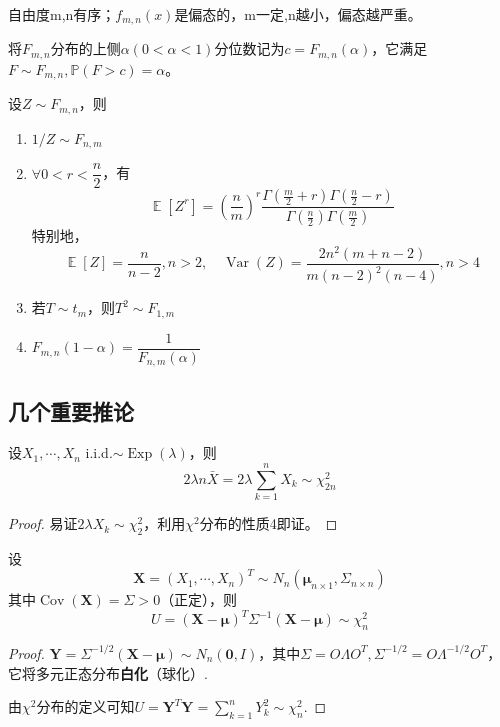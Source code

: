 \documentclass{ctexbook}
\DeclareMathOperator{\Var}{Var}          %
\DeclareMathOperator{\Cov}{Cov}          %
\DeclareMathOperator{\E}{\mathbb{E}}     %
\DeclareMathOperator{\Exp}{Exp}
\begin{document}
自由度m,n有序；$f_{m,n}(x)$是偏态的，m一定,n越小，偏态越严重。

将$F_{m,n}$分布的上侧$\alpha(0<\alpha<1)$分位数记为$c=F_{m,n}(\alpha)$，它满足$F\sim F_{m,n},\mathbb{P}(F>c)=\alpha$。

\begin{proposition}[F变量的性质]
    设$Z\sim F_{m,n}$，则\begin{enumerate}
        \item $1/Z\sim F_{n,m}$
        \item $\forall 0<r<\dfrac{n}{2}$，有$$\E[Z^r]=\left(\frac{n}{m}\right)^r\frac{\Gamma(\frac{m}{2}+r)\Gamma(\frac{n}{2}-r)}{\Gamma(\frac{n}{2})\Gamma(\frac{m}{2})}$$
        特别地，$$\E[Z]=\frac{n}{n-2},n>2,\quad \Var(Z)=\frac{2n^2(m+n-2)}{m(n-2)^2(n-4)},n>4$$
        \item 若$T\sim t_m$，则$T^2\sim F_{1,m}$
        \item $F_{m,n}(1-\alpha)=\dfrac{1}{F_{n,m}(\alpha)}$
    \end{enumerate}
\end{proposition}

\subsection{几个重要推论}

\begin{corollary}
    设$X_1,\cdots,X_n$ i.i.d.$\sim \Exp(\lambda)$，则
    $$2\lambda n\bar{X}=2\lambda\sum_{k=1}^n X_k\sim\chi_{2n}^2$$
\end{corollary}
\begin{proof}
    易证$2\lambda X_k\sim \chi_2^2$，利用$\chi^2$分布的性质4即证。
\end{proof}

\begin{corollary}
    设$$\mathbf{X}=(X_1,\cdots,X_n)^T\sim N_n(\boldsymbol{\mu}_{n\times 1},\Sigma_{n\times n})$$
    其中$\Cov(\mathbf{X})=\Sigma>0$（正定），则$$U=(\mathbf{X}-\boldsymbol{\mu})^T\Sigma^{-1}(\mathbf{X}-\boldsymbol{\mu})\sim \chi_n^2$$
\end{corollary}
\begin{proof}
    $\mathbf{Y}=\Sigma^{-1/2}(\mathbf{X}-\boldsymbol{\mu})\sim N_n(\mathbf{0},I)$，其中$\Sigma=O\Lambda O^T,\Sigma^{-1/2}=O\Lambda^{-1/2}O^T$，它将多元正态分布\textbf{白化}（球化）.

    由$\chi^2$分布的定义可知$U=\mathbf{Y}^T\mathbf{Y}=\sum_{k=1}^n Y_k^2\sim \chi_n^2$.
\end{proof}
\end{document}
